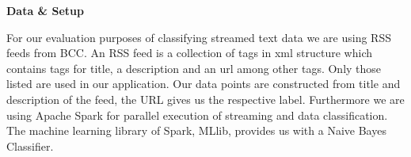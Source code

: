 \begin{center} \textbf{\huge Data \& Setup} \end{center}
For our evaluation purposes of classifying streamed text data we are using RSS feeds from BCC. An RSS feed is a collection of tags in xml structure which contains tags for title, a description and an url among other tags. Only those listed are used in our application. Our data points are constructed from title and description of the feed, the URL gives us the respective label. Furthermore we are using Apache Spark for parallel execution of streaming and data classification. The machine learning library of Spark, MLlib, provides us with a Naive Bayes Classifier.
  

